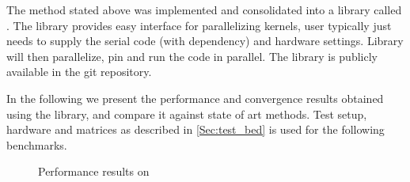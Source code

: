 The method stated above was implemented and consolidated into a library called \RACE. The library provides easy interface for parallelizing kernels, user typically just needs to supply the serial code (with dependency) and hardware settings. Library will then parallelize, pin and run the code in parallel. The library is publicly available in the git repository. %

In the following we present the performance and convergence results obtained using the library, and compare it against state of art methods. Test setup, hardware and matrices as described in \cref{Sec:test_bed} is used for the following benchmarks.

\begin{figure}[thbp]
  	\centering
    \hspace{1em}
    \caption{Performance results on \IVB}
    \label{fig:ivy}
\end{figure}

